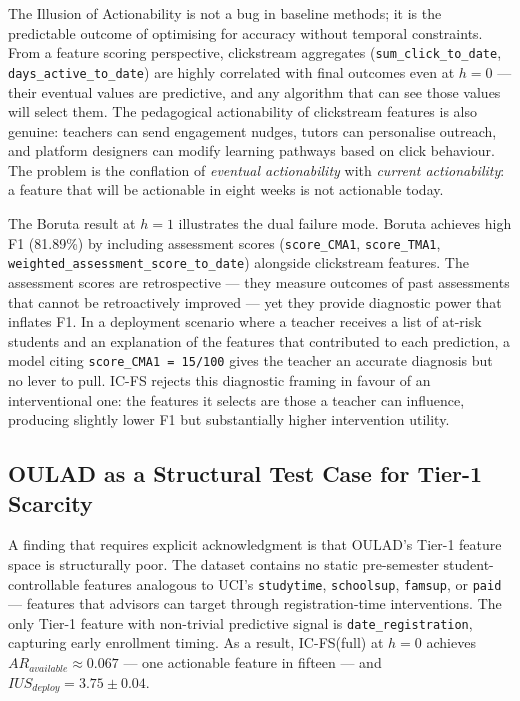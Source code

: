 \documentclass[a4paper,fleqn]{cas-sc}
\begin{document}
The Illusion of Actionability is not a bug in baseline methods; it is the predictable outcome of optimising for accuracy without temporal constraints. From a feature scoring perspective, clickstream aggregates (\texttt{sum\_click\_to\_date}, \texttt{days\_active\_to\_date}) are highly correlated with final outcomes even at $h=0$ --- their eventual values are predictive, and any algorithm that can see those values will select them. The pedagogical actionability of clickstream features is also genuine: teachers can send engagement nudges, tutors can personalise outreach, and platform designers can modify learning pathways based on click behaviour. The problem is the conflation of \textit{eventual actionability} with \textit{current actionability}: a feature that will be actionable in eight weeks is not actionable today.

The Boruta result at $h=1$ illustrates the dual failure mode. Boruta achieves high F1 (81.89\%) by including assessment scores (\texttt{score\_CMA1}, \texttt{score\_TMA1}, \texttt{weighted\_assessment\_score\_to\_date}) alongside clickstream features. The assessment scores are retrospective --- they measure outcomes of past assessments that cannot be retroactively improved --- yet they provide diagnostic power that inflates F1. In a deployment scenario where a teacher receives a list of at-risk students and an explanation of the features that contributed to each prediction, a model citing \texttt{score\_CMA1 = 15/100} gives the teacher an accurate diagnosis but no lever to pull. IC-FS rejects this diagnostic framing in favour of an interventional one: the features it selects are those a teacher can influence, producing slightly lower F1 but substantially higher intervention utility.

\subsection{OULAD as a Structural Test Case for Tier-1 Scarcity}

A finding that requires explicit acknowledgment is that OULAD's Tier-1 feature space is structurally poor. The dataset contains no static pre-semester student-controllable features analogous to UCI's \texttt{studytime}, \texttt{schoolsup}, \texttt{famsup}, or \texttt{paid} --- features that advisors can target through registration-time interventions. The only Tier-1 feature with non-trivial predictive signal is \texttt{date\_registration}, capturing early enrollment timing. As a result, IC-FS(full) at $h=0$ achieves $AR_{available} \approx 0.067$ --- one actionable feature in fifteen --- and $IUS_{deploy} = 3.75 \pm 0.04$.
\end{document}
